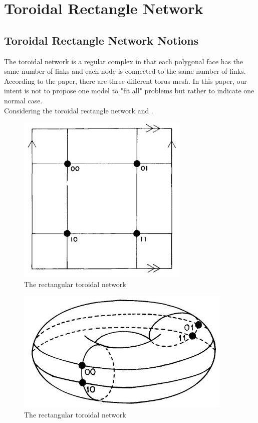 \chapter{Toroidal Rectangle Network}
\label{Chap:Numerical}
\section{Toroidal Rectangle Network Notions}
The toroidal network is a regular complex in that each polygonal face has the same number of links and each node is connected to the same number of links.  According to the paper\cite{robertazzi1988toroidal},  there are three different torus mesh.  In this paper, our intent is not to propose one model to "fit all" problems but rather to indicate one normal case.    
\\  
Considering the toroidal rectangle network  and .   
\begin{figure}[!ht]
\centering
\includegraphics[width=0.5\columnwidth]{figure/rt1.JPG}
\caption{The rectangular toroidal network}
\label{fig:rt1}
\end{figure}

\begin{figure}[!ht]
\centering
\includegraphics[width=0.5\columnwidth]{figure/rt2.JPG}
\caption{The rectangular toroidal network}
\label{fig:rt2}
\end{figure}
  
